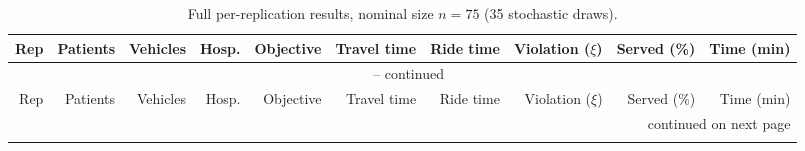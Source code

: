 \begingroup
\footnotesize
\setlength{\tabcolsep}{3pt}
\renewcommand{\arraystretch}{0.90}

\begin{longtable}{rrrrrrrrrr}
\caption{Full per-replication results, nominal size $n=75$ (35 stochastic draws).}
\label{tab:full-75} \\
\toprule
Rep & Patients & Vehicles & Hosp. & Objective & Travel time & Ride time & Violation ($\xi$) & Served (\%) & Time (min) \\
\midrule
\endfirsthead

\multicolumn{10}{c}{\tablename\ \thetable{} -- continued} \\
\toprule
Rep & Patients & Vehicles & Hosp. & Objective & Travel time & Ride time & Violation ($\xi$) & Served (\%) & Time (min) \\
\midrule
\endhead

\midrule
\multicolumn{10}{r}{continued on next page} \\
\endfoot

\bottomrule
\endlastfoot


\end{longtable}
